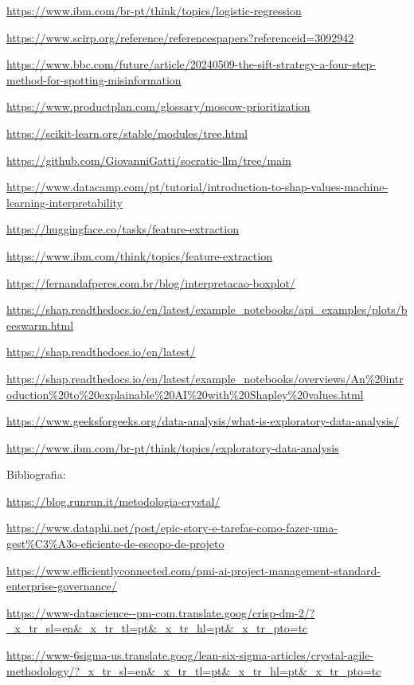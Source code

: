 \documentclass[
  brazilian,
  11pt,
]{article}
\begin{document}
\url{https://www.ibm.com/br-pt/think/topics/logistic-regression}

\url{https://www.scirp.org/reference/referencespapers?referenceid=3092942}

\url{https://www.bbc.com/future/article/20240509-the-sift-strategy-a-four-step-method-for-spotting-misinformation}

\url{https://www.productplan.com/glossary/moscow-prioritization}

\url{https://scikit-learn.org/stable/modules/tree.html}

\url{https://github.com/GiovanniGatti/socratic-llm/tree/main}

\url{https://www.datacamp.com/pt/tutorial/introduction-to-shap-values-machine-learning-interpretability}

\url{https://huggingface.co/tasks/feature-extraction}

\url{https://www.ibm.com/think/topics/feature-extraction}

\url{https://fernandafperes.com.br/blog/interpretacao-boxplot/}

\url{https://shap.readthedocs.io/en/latest/example_notebooks/api_examples/plots/beeswarm.html}

\url{https://shap.readthedocs.io/en/latest/}

\url{https://shap.readthedocs.io/en/latest/example_notebooks/overviews/An\%20introduction\%20to\%20explainable\%20AI\%20with\%20Shapley\%20values.html}

\url{https://www.geeksforgeeks.org/data-analysis/what-is-exploratory-data-analysis/}

\url{https://www.ibm.com/br-pt/think/topics/exploratory-data-analysis}

Bibliografia:

\url{https://blog.runrun.it/metodologia-crystal/}

\href{https://www.dataphi.net/post/epic-story-e-task-como-fazer-uma-gest\%C3\%A3o-eficiente-de-escopo-de-projeto}{https://www.dataphi.net/post/epic-story-e-tarefas-como-fazer-uma-gest\%C3\%A3o-eficiente-de-escopo-de-projeto}

\url{https://www.efficientlyconnected.com/pmi-ai-project-management-standard-enterprise-governance/}

\url{https://www-datascience--pm-com.translate.goog/crisp-dm-2/?_x_tr_sl=en&_x_tr_tl=pt&_x_tr_hl=pt&_x_tr_pto=tc}

\url{https://www-6sigma-us.translate.goog/lean-six-sigma-articles/crystal-agile-methodology/?_x_tr_sl=en&_x_tr_tl=pt&_x_tr_hl=pt&_x_tr_pto=tc}
\end{document}
